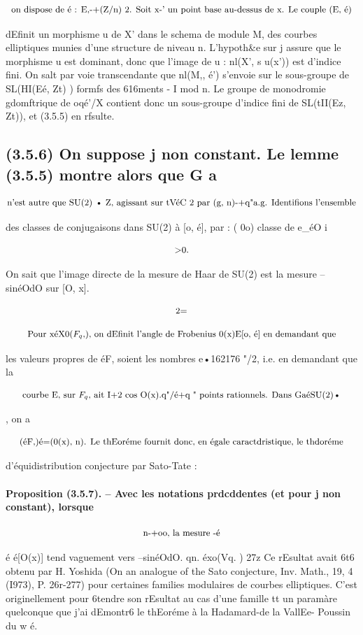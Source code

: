 \documentclass[11pt]{article}
\theoremstyle{remark}
\begin{document}
\[\text{\small on dispose de é : E,-+(Z/n) 2. Soit x-' un point base au-dessus de x. Le couple (E, é)}\]

dEfinit un morphisme u de X' dans le schema de module M, des courbes elliptiques munies d'une structure de niveau n. L'hypoth\&e sur j assure que le morphisme u est dominant, donc que l'image de u : nl(X', s u(x')) est d'indice fini. On salt par voie transcendante que nl(M,, é') s'envoie sur le sous-groupe de SL(HI(Eé, Zt) ) formfs des 616ments - I mod n. Le groupe de monodromie gdomftrique de oqé'/X contient donc un sous-groupe d'indice fini de SL(tII(Ez, Zt)), et (3.5.5) en rfsulte.

\subsection*{(3.5.6) On suppose j non constant. Le lemme (3.5.5) montre alors que G a}

\[\text{\small n'est autre que SU(2) • Z, agissant sur tVéC 2 par (g, n)-+q"a.g. Identifions l'ensemble}\]

des classes de conjugaisons dans SU(2) à [o, é], par : ( 0o) classe de e\_éO i

\[\text{\small >0.}\]

On sait que l'image directe de la mesure de Haar de SU(2) est la mesure --sinéOdO sur [O, x].

\[\text{\small 2=}\]

\[\text{\small Pour xéX0(\(F_q\),), on dEfinit l'angle de Frobenius 0(x)E[o, é] en demandant que}\]

les valeurs propres de éF, soient les nombres e•162176 "/2, i.e. en demandant que la

\[\text{\small courbe E, sur \(F_q\), ait I+2 cos O(x).q"/é+q " points rationnels. Dans GaéSU(2)•}\]

, on a

\[\text{\small (éF,)é=(0(x), n). Le thEoréme fournit donc, en égale caractdristique, le thdoréme}\]

d'équidistribution conjecture par Sato-Tate :

\paragraph{Proposition (3.5.7). -- Avec les notations prdcddentes (et pour j non constant), lorsque}

\[\text{\small n-+oo, la mesure -é}\]

é é[O(x)] tend vaguement vers --sinéOdO. qn. éxo(Vq. ) 27z Ce rEsultat avait 6t6 obtenu par H. Yoshida (On an analogue of the Sato conjecture, Inv. Math., 19, 4 (I973), P. 26r-277) pour certaines families modulaires de courbes elliptiques. C'est originellement pour 6tendre son rEsultat au cas d'une famille tt un paramàre quelconque que j'ai dEmontr6 le thEoréme à la Hadamard-de la VallEe- Poussin du w é.
\end{document}
